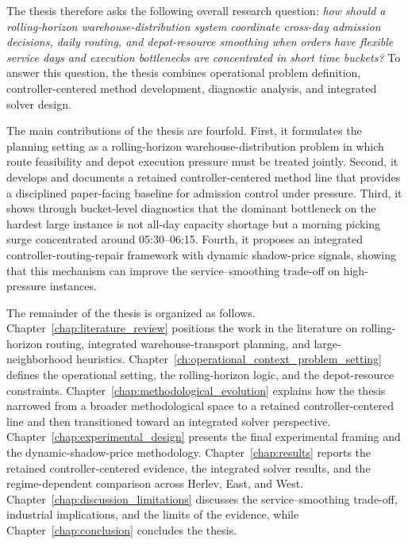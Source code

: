The thesis therefore asks the following overall research question: \emph{how should a rolling-horizon warehouse-distribution system coordinate cross-day admission decisions, daily routing, and depot-resource smoothing when orders have flexible service days and execution bottlenecks are concentrated in short time buckets?} To answer this question, the thesis combines operational problem definition, controller-centered method development, diagnostic analysis, and integrated solver design.

The main contributions of the thesis are fourfold. First, it formulates the planning setting as a rolling-horizon warehouse-distribution problem in which route feasibility and depot execution pressure must be treated jointly. Second, it develops and documents a retained controller-centered method line that provides a disciplined paper-facing baseline for admission control under pressure. Third, it shows through bucket-level diagnostics that the dominant bottleneck on the hardest large instance is not all-day capacity shortage but a morning picking surge concentrated around 05:30--06:15. Fourth, it proposes an integrated controller-routing-repair framework with dynamic shadow-price signals, showing that this mechanism can improve the service--smoothing trade-off on high-pressure instances.

The remainder of the thesis is organized as follows. Chapter~\ref{chap:literature_review} positions the work in the literature on rolling-horizon routing, integrated warehouse-transport planning, and large-neighborhood heuristics. Chapter~\ref{ch:operational_context_problem_setting} defines the operational setting, the rolling-horizon logic, and the depot-resource constraints. Chapter~\ref{chap:methodological_evolution} explains how the thesis narrowed from a broader methodological space to a retained controller-centered line and then transitioned toward an integrated solver perspective. Chapter~\ref{chap:experimental_design} presents the final experimental framing and the dynamic-shadow-price methodology. Chapter~\ref{chap:results} reports the retained controller-centered evidence, the integrated solver results, and the regime-dependent comparison across Herlev, East, and West. Chapter~\ref{chap:discussion_limitations} discusses the service--smoothing trade-off, industrial implications, and the limits of the evidence, while Chapter~\ref{chap:conclusion} concludes the thesis.
